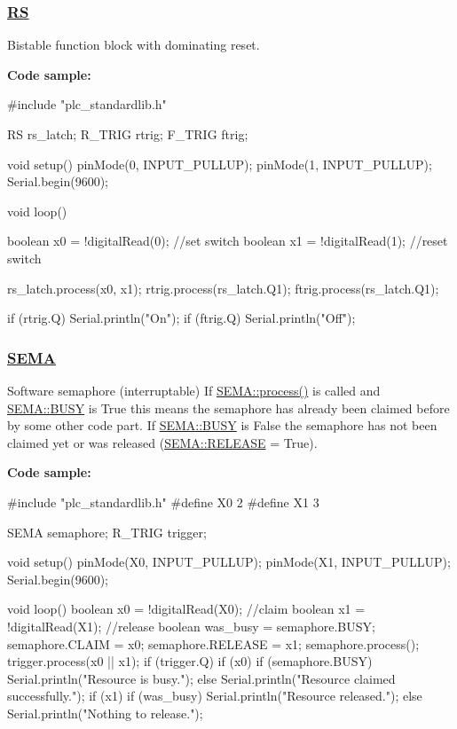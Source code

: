 \subsubsection*{\hyperlink{class_r_s}{R\+S}}

Bistable function block with dominating reset.

{\bfseries Code sample\+:} \begin{DoxyVerb}#include "plc_standardlib.h"

RS rs_latch;
R_TRIG rtrig;
F_TRIG ftrig;

void setup() {
    pinMode(0, INPUT_PULLUP);
    pinMode(1, INPUT_PULLUP);
    Serial.begin(9600);
}

void loop() {
    boolean x0 = !digitalRead(0); //set switch
    boolean x1 = !digitalRead(1); //reset switch

    rs_latch.process(x0, x1);
    rtrig.process(rs_latch.Q1);
    ftrig.process(rs_latch.Q1);

    if (rtrig.Q) {
        Serial.println("On");
    }
    if (ftrig.Q) {
        Serial.println("Off");
    }
}
\end{DoxyVerb}


\subsubsection*{\hyperlink{class_s_e_m_a}{S\+E\+M\+A}}

Software semaphore (interruptable) If \hyperlink{class_s_e_m_a_acf691410eccec2dafad4f12f9a5e4302}{S\+E\+M\+A\+::process()} is called and \hyperlink{class_s_e_m_a_af4df5a7c16c99bfc19f4902046ba26f9}{S\+E\+M\+A\+::\+B\+U\+S\+Y} is True this means the semaphore has already been claimed before by some other code part. If \hyperlink{class_s_e_m_a_af4df5a7c16c99bfc19f4902046ba26f9}{S\+E\+M\+A\+::\+B\+U\+S\+Y} is False the semaphore has not been claimed yet or was released (\hyperlink{class_s_e_m_a_a2660b1bd98ee2aac42e34d10179d6a4f}{S\+E\+M\+A\+::\+R\+E\+L\+E\+A\+S\+E} = True).

{\bfseries Code sample\+:} \begin{DoxyVerb}#include "plc_standardlib.h"
#define X0 2
#define X1 3

SEMA semaphore;
R_TRIG trigger;

void setup() {
    pinMode(X0, INPUT_PULLUP);
    pinMode(X1, INPUT_PULLUP);
    Serial.begin(9600);
}

void loop() {
    boolean x0 = !digitalRead(X0); //claim
    boolean x1 = !digitalRead(X1); //release
    boolean was_busy = semaphore.BUSY;
    semaphore.CLAIM = x0;
    semaphore.RELEASE = x1;
    semaphore.process();
    trigger.process(x0 || x1);
    if (trigger.Q) {
        if (x0) {
            if (semaphore.BUSY) {
                Serial.println("Resource is busy.");
            }
            else {
                Serial.println("Resource claimed successfully.");
            }
        }
        if (x1) {
            if (was_busy) {
                Serial.println("Resource released.");
            }
            else {
                Serial.println("Nothing to release.");
            }
        }
    }
}
\end{DoxyVerb}


